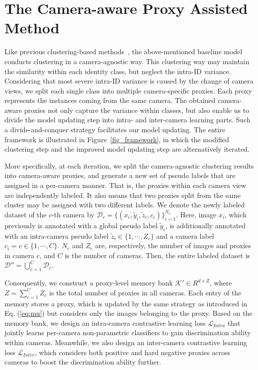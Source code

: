 \documentclass[letterpaper]{article} %
\begin{document}
\section{The Camera-aware Proxy Assisted Method}
Like previous clustering-based methods~\cite{unsup_clustering,lin2019aBottom,zeng2020hierarchical,zhai2020ad}, the above-mentioned baseline model conducts clustering in a camera-agnostic way. This clustering way may maintain the similarity within each identity class, but neglect the intra-ID variance. Considering that most severe intra-ID variance is caused by the change of camera views, we split each single class into multiple camera-specific proxies. Each proxy represents the instances coming from the same camera. The obtained camera-aware proxies not only capture the variance within classes, but also enable us to divide the model updating step into intra- and inter-camera learning parts. Such a divide-and-conquer strategy facilitates our model updating. The entire framework is illustrated in Figure~\ref{fig_framework}, in which the modified clustering step and the improved model updating step are alternatively iterated. 



More specifically, at each iteration, we split the camera-agnostic clustering results into camera-aware proxies, and generate a new set of pseudo labels that are assigned in a per-camera manner. That is, the proxies within each camera view are independently labeled. It also means that two proxies split from the same cluster may be assigned with two different labels. We denote the newly labeled dataset of the $c$-th camera by $\mathcal{D}_c = \{(x_i, \tilde{y}_i, \tilde{z}_i, c_i)\}_{i=1}^{N_c}$. Here, image $x_i$, which previously is annotated with a global pseudo label $\tilde{y}_i$, is additionally annotated with an intra-camera pseudo label $\tilde{z}_i \in \{1, \cdots, Z_c\}$ and a camera label $c_i = c \in \{1, \cdots, C\}$. $N_c$ and $Z_c$ are, respectively, the number of images and proxies in camera $c$, and $C$ is the number of cameras. Then, the entire labeled dataset is $\mathcal{D}''=\bigcup_{c=1}^C \mathcal{D}_c$.

Consequently, we construct a proxy-level memory bank $\mathcal{K}'\in R^{d \times Z}$, where $Z=\sum_{c=1}^C Z_c$ is the total number of proxies in all cameras. Each entry of the memory stores a proxy, which is updated by the same strategy as introduced in Eq. (\ref{eq:mu}) but considers only the images belonging to the proxy. Based on the memory bank, we design an intra-camera contrastive learning loss $\mathcal{L}_{Intra}$ that jointly learns per-camera non-parametric classifiers to gain discrimination ability within cameras. Meanwhile, we also design an inter-camera contrastive learning loss $\mathcal{L}_{Inter}$, which considers both positive and hard negative proxies across cameras to boost the discrimination ability further.  
\end{document}

